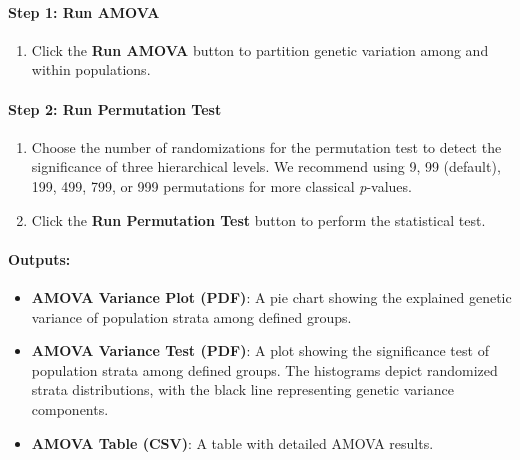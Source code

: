 \documentclass[
]{book}
\providecommand{\tightlist}{%
  \setlength{\itemsep}{0pt}\setlength{\parskip}{0pt}}
\begin{document}
\paragraph*{\texorpdfstring{\textbf{Step 1: Run AMOVA}}{Step 1: Run AMOVA}}\label{step-1-run-amova}

\begin{enumerate}
\def\labelenumi{\arabic{enumi}.}
\tightlist
\item
  Click the {\textbf{Run AMOVA}} button to partition genetic variation among and within populations.
\end{enumerate}

\paragraph*{\texorpdfstring{\textbf{Step 2: Run} Permutation Test}{Step 2: Run Permutation Test}}\label{step-2-run-permutation-test}

\begin{enumerate}
\def\labelenumi{\arabic{enumi}.}
\item
  Choose the number of randomizations for the permutation test to detect the significance of three hierarchical levels. We recommend using 9, 99 (default), 199, 499, 799, or 999 permutations for more classical \emph{p}-values.
\item
  Click the {\textbf{Run Permutation Test}} button to perform the statistical test.
\end{enumerate}

\paragraph*{Outputs:}\label{outputs-15}

\begin{itemize}
\item
  \textbf{AMOVA Variance Plot (PDF)}: A pie chart showing the explained genetic variance of population strata among defined groups.
\item
  \textbf{AMOVA Variance Test (PDF)}: A plot showing the significance test of population strata among defined groups. The histograms depict randomized strata distributions, with the black line representing genetic variance components.
\item
  \textbf{AMOVA Table (CSV)}: A table with detailed AMOVA results.
\end{itemize}
\end{document}
